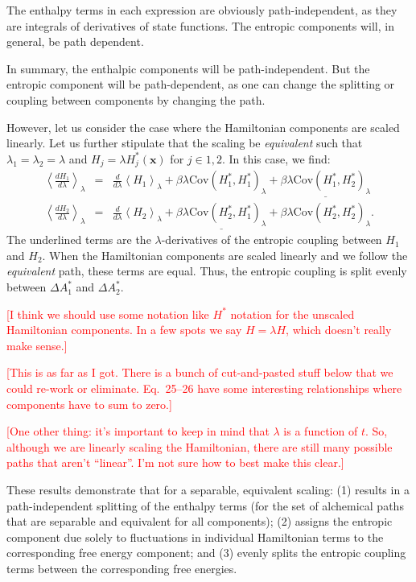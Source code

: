 \documentclass[%
 preprint,
 amsmath,amssymb,
 aps,
]{revtex4-1}
\newcommand{\warning}[1]{{\textsf{{\textcolor{red}{{[#1]}{}}}}}}
\renewcommand{\vec}[1]{{\bm{#1}}}
\begin{document}
The enthalpy terms in each expression are obviously path-independent, as they are integrals of derivatives of state functions. The entropic components will, in general, be path dependent.

In summary, the enthalpic components will be path-independent. But the entropic component will be path-dependent, as one can change the splitting or coupling between components by changing the path.

However, let us consider the case where the Hamiltonian components are scaled linearly. Let us further stipulate that the scaling be \emph{equivalent} such that $\lambda_1 = \lambda_2 = \lambda$ and $H_j = \lambda H_j^*(\vec x)$ for $j\in{1,2}$. In this case, we find:
\begin{eqnarray}
\left<\frac{dH_1}{d\lambda}\right>_\lambda &=& 
\frac{d}{d\lambda}\left<H_1\right>_\lambda +
\beta\lambda\mathrm{Cov}\left(H_1^*,H_1^*\right)_\lambda+
\underline{\beta\lambda\mathrm{Cov}\left(H_1^*,H_2^*\right)_\lambda}\\
\left<\frac{dH_2}{d\lambda}\right>_\lambda &=& 
\frac{d}{d\lambda}\left<H_2\right>_\lambda +
\underline{\beta\lambda\mathrm{Cov}\left(H_2^*,H_1^* \right)_\lambda}+
\beta\lambda\mathrm{Cov}\left(H_2^*, H_2^* \right)_\lambda.
\end{eqnarray}
The underlined terms are the $\lambda$-derivatives of the entropic coupling between $H_1$ and $H_2$. When the Hamiltonian components are scaled linearly and we follow the \emph{equivalent} path, these terms are equal. Thus, the entropic coupling is split evenly between $\Delta A^*_1$ and $\Delta A^*_2$.

\warning{I think we should use some notation like $H^*$ notation for the unscaled Hamiltonian components. In a few spots we say $H = \lambda H$, which doesn't really make sense.}

\warning{This is as far as I got. There is a bunch of cut-and-pasted stuff below that we could re-work or eliminate. Eq.~25--26 have some interesting relationships where components have to sum to zero.}

\warning{One other thing: it's important to keep in mind that $\lambda$ is a function of $t$. So, although we are linearly scaling the Hamiltonian, there are still many possible paths that aren't ``linear''. I'm not sure how to best make this clear.}

These results demonstrate that for a separable, equivalent scaling: (1) results in a path-independent splitting of the enthalpy terms (for the set of alchemical paths that are separable and equivalent for all components); (2) assigns the entropic component due solely to fluctuations in individual Hamiltonian terms to the corresponding free energy component; and (3) evenly splits the entropic coupling terms between the corresponding free energies.
\end{document}
